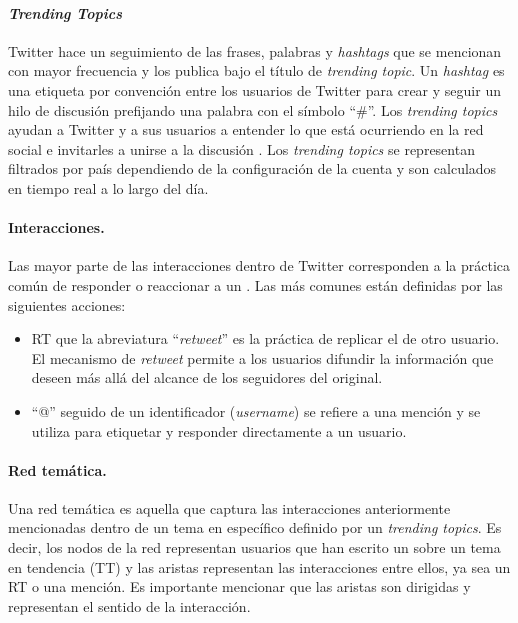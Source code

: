 \paragraph{\textit{Trending Topics}}
Twitter hace un seguimiento de las frases, palabras y \textit{hashtags} que se mencionan con mayor frecuencia y los publica bajo el título de \textit{trending topic}. Un \textit{hashtag} es una etiqueta por convención entre los usuarios de Twitter para crear y seguir un hilo de discusión prefijando una palabra con el símbolo \enquote{\#}. Los \textit{trending topics} ayudan a Twitter y a sus usuarios a entender lo que está ocurriendo en la red social e invitarles a unirse a la discusión \cite{twitter_twittercom_nodate}. Los \textit{trending topics} se representan filtrados por país dependiendo de la configuración de la cuenta y son calculados en tiempo real a lo largo del día. 

\paragraph{Interacciones.} \label{interacciones_twitter} Las mayor parte de las interacciones dentro de Twitter corresponden a la práctica común de responder o reaccionar a un \tweet  \cite{kwak_what_2010}. Las más comunes están definidas por las siguientes acciones: 
\begin{itemize}
    \item RT que la abreviatura \enquote{\textit{retweet}} es la práctica de replicar el \tweet de otro usuario. El mecanismo de \textit{retweet} permite a los usuarios difundir la información que deseen más allá del alcance de los seguidores del \tweet original.

    \item \enquote{@} seguido de un identificador (\textit{username}) se refiere a una mención y se utiliza para etiquetar y responder directamente a un usuario.
\end{itemize}

\paragraph{Red temática.} Una red temática es aquella que captura las interacciones anteriormente mencionadas dentro de un tema en específico definido por un \textit{trending topics}. Es decir, los nodos de la red representan usuarios que han escrito un \tweet sobre un tema en tendencia (TT) y las aristas representan las interacciones entre ellos, ya sea un RT o una mención. Es importante mencionar que las aristas son dirigidas y representan el sentido de la interacción.

